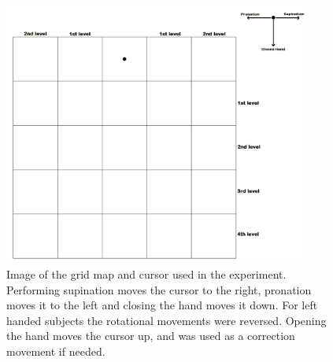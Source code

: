 \begin{figure}[H]                 
	\includegraphics[width=0.9\textwidth]{figures/gridmap2}  
	\caption{Image of the grid map and cursor used in the experiment. Performing supination moves the cursor to the right, pronation moves it to the left and closing the hand moves it down. For left handed subjects the rotational movements were reversed. Opening the hand moves the cursor up, and was used as a correction movement if needed.}
	\label{fig:meth:gridmap} 
\end{figure}

